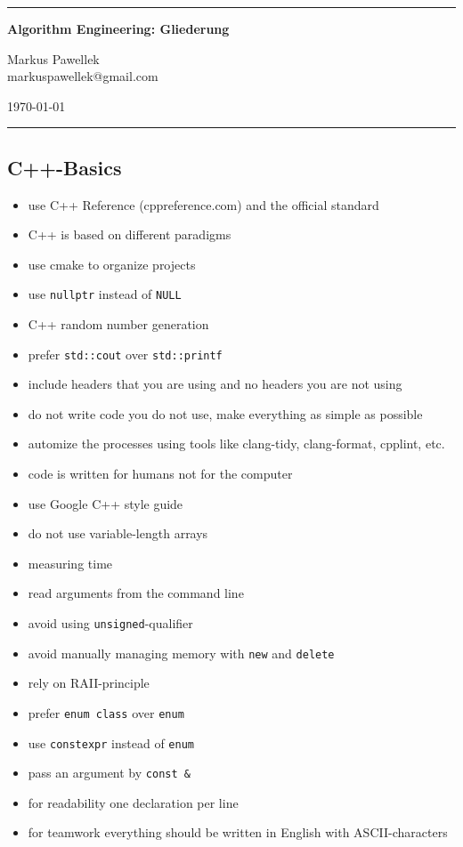 \documentclass[8pt,a4paper,fleqn]{article}
\begin{document}
  \hrule
  \begin{center}
  \huge \textbf{Algorithm Engineering: Gliederung}
  \end{center}
  \bigskip
  {\large \begin{minipage}[c]{0.4\textwidth}\flushleft Markus Pawellek \\ markuspawellek@gmail.com\end{minipage} \hfill \begin{minipage}[c]{0.4\textwidth}\flushright\today\end{minipage}}
  \medskip
  \hrule
  \bigskip

  \begin{multicols}{2}
  \section{C++-Basics} %
  \label{sec:c_basics}
  \begin{itemize}
    \item use C++ Reference (cppreference.com) and the official standard
    \item C++ is based on different paradigms
    \item use cmake to organize projects
    \item use \texttt{nullptr} instead of \texttt{NULL}
    \item C++ random number generation
    \item prefer \texttt{std::cout} over \texttt{std::printf}
    \item include headers that you are using and no headers you are not using
    \item do not write code you do not use, make everything as simple as possible
    \item automize the processes using tools like clang-tidy, clang-format, cpplint, etc.
    \item code is written for humans not for the computer
    \item use Google C++ style guide
    \item do not use variable-length arrays
    \item measuring time
    \item read arguments from the command line
    \item avoid using \texttt{unsigned}-qualifier
    \item avoid manually managing memory with \texttt{new} and \texttt{delete}
    \item rely on RAII-principle
    \item prefer \texttt{enum class} over \texttt{enum}
    \item use \texttt{constexpr} instead of \texttt{enum}
    \item pass an argument by \texttt{const \&}
    \item for readability one declaration per line
    \item for teamwork everything should be written in English with ASCII-characters
  \end{itemize}


\end{multicols}
\end{document}
